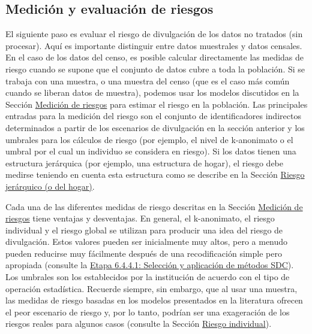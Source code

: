 \documentclass[
]{book}
\theoremstyle{definition}
\theoremstyle{definition}
\theoremstyle{definition}
\theoremstyle{definition}
\theoremstyle{remark}
\begin{document}
\hypertarget{mediciuxf3n-y-evaluaciuxf3n-de-riesgos}{%
\subsection{Medición y evaluación de riesgos}\label{mediciuxf3n-y-evaluaciuxf3n-de-riesgos}}

El siguiente paso es evaluar el riesgo de divulgación de los datos no tratados (sin procesar). Aquí es importante distinguir entre datos muestrales y datos censales. En el caso de los datos del censo, es posible calcular directamente las medidas de riesgo cuando se supone que el conjunto de datos cubre a toda la población. Si se trabaja con una muestra, o una muestra del censo (que es el caso más común cuando se liberan datos de muestra), podemos usar los modelos discutidos en la Sección \protect\hyperlink{mediciuxf3n-de-riesgos}{Medición de riesgos} para estimar el riesgo en la población. Las principales entradas para la medición del riesgo son el conjunto de identificadores indirectos determinados a partir de los escenarios de divulgación en la sección anterior y los umbrales para los cálculos de riesgo (por ejemplo, el nivel de k-anonimato o el umbral por el cual un individuo se considera en riesgo). Si los datos tienen una estructura jerárquica (por ejemplo, una estructura de hogar), el riesgo debe medirse teniendo en cuenta esta estructura como se describe en la Sección \protect\hyperlink{riesgo-jeruxe1rquico-o-del-hogar}{Riesgo jerárquico (o del hogar)}.

Cada una de las diferentes medidas de riesgo descritas en la Sección \protect\hyperlink{mediciuxf3n-de-riesgos}{Medición de riesgos} tiene ventajas y desventajas. En general, el k-anonimato, el riesgo individual y el riesgo global se utilizan para producir una idea del riesgo de divulgación. Estos valores pueden ser inicialmente muy altos, pero a menudo pueden reducirse muy fácilmente después de una recodificación simple pero apropiada (consulte la \protect\hyperlink{etapa-6.4.4.1-selecciuxf3n-y-aplicaciuxf3n-de-muxe9todos-sdc}{Etapa 6.4.4.1: Selección y aplicación de métodos SDC}). Los umbrales son los establecidos por la institución de acuerdo con el tipo de operación estadística. Recuerde siempre, sin embargo, que al usar una muestra, las medidas de riesgo basadas en los modelos presentados en la literatura ofrecen el peor escenario de riesgo y, por lo tanto, podrían ser una exageración de los riesgos reales para algunos casos (consulte la Sección \protect\hyperlink{riesgo-individual}{Riesgo individual}).
\end{document}

